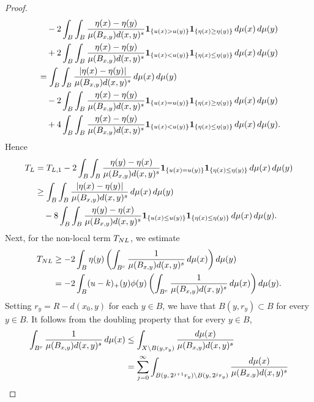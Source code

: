 \documentclass[10pt,a4paper]{amsart}
\begin{document}
\begin{proof}
\begin{align}
			&\quad - 2  \int_B\int_B \frac{\eta(x)-\eta(y) }{\mu(B_{x,y}) d(x,y)^s} {\bf 1}_{\{ u(x)> u(y)\}} {\bf 1}_{\{\eta(x)\geq \eta(y)\}} \,d\mu(x)\,d\mu(y) \notag \\
			&\quad + 2  \int_B\int_B \frac{\eta(x)-\eta(y) }{\mu(B_{x,y}) d(x,y)^s} {\bf 1}_{\{ u(x)< u(y)\}} {\bf 1}_{\{\eta(x)\leq \eta(y)\}} \,d\mu(x)\,d\mu(y) \notag \\
			&=   \int_B\int_B \frac{|\eta(x)-\eta(y)| }{\mu(B_{x,y}) d(x,y)^s}  \,d\mu(x)\,d\mu(y)\notag \\ 
			&\quad - 2  \int_B\int_B \frac{\eta(x)-\eta(y) }{\mu(B_{x,y}) d(x,y)^s} {\bf 1}_{\{ u(x)= u(y)\}} {\bf 1}_{\{\eta(x)\geq \eta(y)\}} \,d\mu(x)\,d\mu(y) \notag \\
			&\quad + 4 \int_B\int_B \frac{\eta(x)-\eta(y) }{\mu(B_{x,y}) d(x,y)^s} {\bf 1}_{\{ u(x)< u(y)\}} {\bf 1}_{\{\eta(x)\leq \eta(y)\}} \,d\mu(x)\,d\mu(y) .\notag
		\end{align}
		{
			Hence
			\begin{align}
				\notag T_{\rm L}&= T_{\rm L,1}   -2\int_B\int_{B}  \frac{ \eta(y)-\eta(x) }{\mu(B_{x,y}) d(x,y)^s} {\bf 1}_{\{u(x)=u(y)\}}{\bf 1}_{\{ \eta(x)\leq \eta(y)\}}\,d\mu(x)\,d\mu(y)\\
				& \geq  \int_B\int_B \frac{|\eta(x)-\eta(y)| }{\mu(B_{x,y}) d(x,y)^s}  \,d\mu(x)\,d\mu(y)\notag\\
				\label{eq2-2oct} & \quad - 8 \int_B\int_B \frac{\eta(y)-\eta(x) }{\mu(B_{x,y}) d(x,y)^s} {\bf 1}_{\{ u(x)\leq  u(y)\}} {\bf 1}_{\{\eta(x)\leq \eta(y)\}} \,d\mu(x)\,d\mu(y).
			\end{align}
		}
		Next, for the non-local term $T_{\rm NL}$,
		we estimate 
		\begin{align*}
			T_{\rm NL}&\geq  -2 \int_{B} \eta(y) \left(\int_{B^c} \frac{1}{\mu(B_{x,y}) d(x,y)^s}\,d\mu(x) \right) d\mu(y)\\
			&=  -2 \int_{B} (u-k)_+(y)\phi(y) \left(\int_{B^c} \frac{1}{\mu(B_{x,y}) d(x,y)^s}\,d\mu(x) \right) d\mu(y).
		\end{align*}
		Setting $r_y=R-d(x_0,y)$ for each $y\in B$, we have that  $B(y,r_y)\subset B$
		for every $y\in B$. It follows
		from the doubling property that  for every $y\in B$,
		\begin{align}\label{eq2-3Lemma2}
			\int_{B^c} \frac{1}{\mu(B_{x,y}) d(x,y)^s}\,d\mu(x)
			&\leq \int_{X\setminus B(y,r_y)} \frac{d\mu(x)}{\mu(B_{x,y}) d(x,y)^s}\notag\\
			&=  \sum_{j=0}^\infty \int_{B(y,\,2^{j+1}r_y)\setminus B(y,\, 2^jr_y)} \frac{d\mu(x)}{\mu(B_{x,y}) d(x,y)^s}\notag\\

\end{align}
\end{proof}
\end{document}
